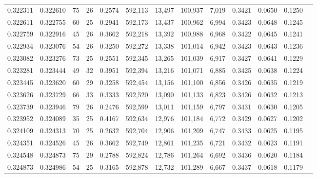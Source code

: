 \begin{tabular}{rrrrrrrrrrrrr}
0.322311 & 0.322610 &  75 &  26 &                                     0.2574 & 592,113 &  13,497 & 100,937 &   7,019 & 0.3421 & 0.0650 & 0.1250 \\
0.322611 & 0.322755 &  60 &  25 &                                     0.2941 & 592,173 &  13,437 & 100,962 &   6,994 & 0.3423 & 0.0648 & 0.1245 \\
0.322759 & 0.322916 &  45 &  26 &                                     0.3662 & 592,218 &  13,392 & 100,988 &   6,968 & 0.3422 & 0.0645 & 0.1241 \\
0.322934 & 0.323076 &  54 &  26 &                                     0.3250 & 592,272 &  13,338 & 101,014 &   6,942 & 0.3423 & 0.0643 & 0.1236 \\
0.323082 & 0.323276 &  73 &  25 &                                     0.2551 & 592,345 &  13,265 & 101,039 &   6,917 & 0.3427 & 0.0641 & 0.1229 \\
0.323281 & 0.323444 &  49 &  32 &                                     0.3951 & 592,394 &  13,216 & 101,071 &   6,885 & 0.3425 & 0.0638 & 0.1224 \\
0.323445 & 0.323620 &  60 &  29 &                                     0.3258 & 592,454 &  13,156 & 101,100 &   6,856 & 0.3426 & 0.0635 & 0.1219 \\
0.323626 & 0.323729 &  66 &  33 &                                     0.3333 & 592,520 &  13,090 & 101,133 &   6,823 & 0.3426 & 0.0632 & 0.1213 \\
0.323739 & 0.323946 &  79 &  26 &                                     0.2476 & 592,599 &  13,011 & 101,159 &   6,797 & 0.3431 & 0.0630 & 0.1205 \\
0.323952 & 0.324089 &  35 &  25 &                                     0.4167 & 592,634 &  12,976 & 101,184 &   6,772 & 0.3429 & 0.0627 & 0.1202 \\
0.324109 & 0.324313 &  70 &  25 &                                     0.2632 & 592,704 &  12,906 & 101,209 &   6,747 & 0.3433 & 0.0625 & 0.1195 \\
0.324351 & 0.324526 &  45 &  26 &                                     0.3662 & 592,749 &  12,861 & 101,235 &   6,721 & 0.3432 & 0.0623 & 0.1191 \\
0.324548 & 0.324873 &  75 &  29 &                                     0.2788 & 592,824 &  12,786 & 101,264 &   6,692 & 0.3436 & 0.0620 & 0.1184 \\
0.324873 & 0.324986 &  54 &  25 &                                     0.3165 & 592,878 &  12,732 & 101,289 &   6,667 & 0.3437 & 0.0618 & 0.1179 \\

\end{tabular}
